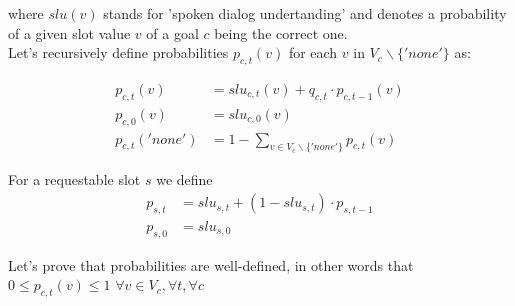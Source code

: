 \documentclass[12pt,titlepage,a4paper]{article}
\begin{document}
\noindent where $slu(v)$ stands for 'spoken dialog undertanding' and denotes a probability of a given slot value $v$ of a goal $c$ being the correct one.\\

\noindent Let's recursively define probabilities $p_{c,t}(v)$ for each $v$ in $V_c \backslash \{'none'\}$ as: 

\begin{align}
    \label{eqn:p_c_t}
    p_{c,t}(v) &=slu_{c,t}(v) + q_{c,t} \cdot p_{c,t-1}(v) \\
    \label{eqn:p_c_0}
    p_{c,0}(v) &= slu_{c,0}(v) \\
    \label{eqn:p_c_t_none}
    p_{c,t}('none') &= 1 - \sum_{v \in V_c \backslash \{'none'\}}p_{c,t}(v)
\end{align}

\noindent For a requestable slot $s$ we define 
\begin{align}
    \label{eqn:p_s_t}
    p_{s,t} &= slu_{s,t} + (1 - slu_{s, t})\cdot p_{s,t-1} \\
    \label{eqn:p_s_0}
    p_{s,0} &= slu_{s,0}
\end{align}

\noindent Let's prove that probabilities are well-defined, in other words that $0 \leq p_{c,t}(v) \leq 1$ $\forall v \in V_c, \forall t, \forall c$
\end{document}
